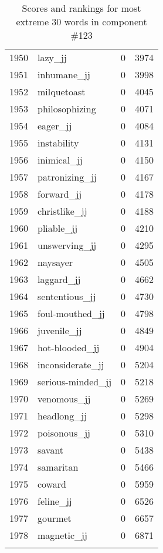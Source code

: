 \begin{longtable}[!htbp]{| rlr@{.}l |}
    1950 & lazy\_jj & 0 & 3974 \\
    1951 & inhumane\_jj & 0 & 3998 \\
    1952 & milquetoast & 0 & 4045 \\
    1953 & philosophizing & 0 & 4071 \\
    1954 & eager\_jj & 0 & 4084 \\
    1955 & instability & 0 & 4131 \\
    1956 & inimical\_jj & 0 & 4150 \\
    1957 & patronizing\_jj & 0 & 4167 \\
    1958 & forward\_jj & 0 & 4178 \\
    1959 & christlike\_jj & 0 & 4188 \\
    1960 & pliable\_jj & 0 & 4210 \\
    1961 & unswerving\_jj & 0 & 4295 \\
    1962 & naysayer & 0 & 4505 \\
    1963 & laggard\_jj & 0 & 4662 \\
    1964 & sententious\_jj & 0 & 4730 \\
    1965 & foul-mouthed\_jj & 0 & 4798 \\
    1966 & juvenile\_jj & 0 & 4849 \\
    1967 & hot-blooded\_jj & 0 & 4904 \\
    1968 & inconsiderate\_jj & 0 & 5204 \\
    1969 & serious-minded\_jj & 0 & 5218 \\
    1970 & venomous\_jj & 0 & 5269 \\
    1971 & headlong\_jj & 0 & 5298 \\
    1972 & poisonous\_jj & 0 & 5310 \\
    1973 & savant & 0 & 5438 \\
    1974 & samaritan & 0 & 5466 \\
    1975 & coward & 0 & 5959 \\
    1976 & feline\_jj & 0 & 6526 \\
    1977 & gourmet & 0 & 6657 \\
    1978 & magnetic\_jj & 0 & 6871 \\
    \hline
    \caption{Scores and rankings for most extreme 30 words in component \#123} \\
\end{longtable}
